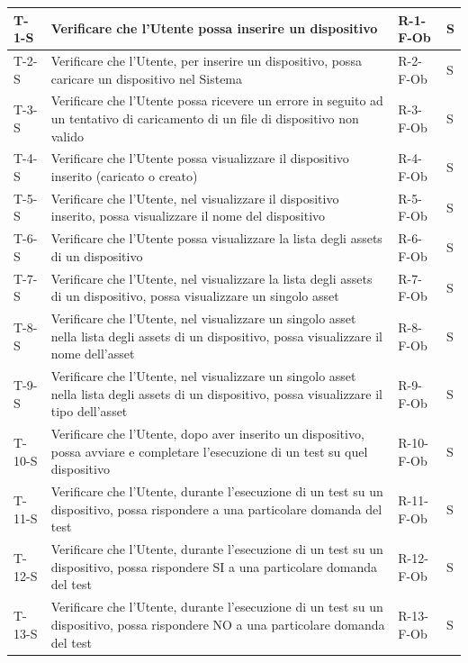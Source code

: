 \documentclass[a4paper,12pt]{article}
\begin{document}
{{\begin{longtable}{|p{}|p{}|p{}|p{}|}
                \hline
                \endlastfoot
                \hline
                T-1-S & Verificare che l'Utente possa inserire un dispositivo & R-1-F-Ob & S \\ \hline
                T-2-S & Verificare che l'Utente, per inserire un dispositivo, possa caricare un dispositivo nel Sistema & R-2-F-Ob & S \\ \hline
                T-3-S & Verificare che l'Utente possa ricevere un errore in seguito ad un tentativo di caricamento di un file di dispositivo non valido & R-3-F-Ob & S \\ \hline
                T-4-S & Verificare che l'Utente possa visualizzare il dispositivo inserito (caricato o creato) & R-4-F-Ob & S \\ \hline
                T-5-S & Verificare che l'Utente, nel visualizzare il dispositivo inserito, possa visualizzare il nome del dispositivo & R-5-F-Ob & S \\ \hline
                T-6-S & Verificare che l'Utente possa visualizzare la lista degli assets di un dispositivo & R-6-F-Ob & S \\ \hline
                T-7-S & Verificare che l'Utente, nel visualizzare la lista degli assets di un dispositivo, possa visualizzare un singolo asset & R-7-F-Ob & S \\ \hline
                T-8-S & Verificare che l'Utente, nel visualizzare un singolo asset nella lista degli assets di un dispositivo, possa visualizzare il nome dell'asset & R-8-F-Ob & S \\ \hline
                T-9-S & Verificare che l'Utente, nel visualizzare un singolo asset nella lista degli assets di un dispositivo, possa visualizzare il tipo dell'asset & R-9-F-Ob & S \\ \hline
                T-10-S & Verificare che l'Utente, dopo aver inserito un dispositivo, possa avviare e completare l'esecuzione di un test su quel dispositivo & R-10-F-Ob & S \\ \hline
                T-11-S & Verificare che l'Utente, durante l'esecuzione di un test su un dispositivo, possa rispondere a una particolare domanda del test & R-11-F-Ob & S \\ \hline
                T-12-S & Verificare che l'Utente, durante l'esecuzione di un test su un dispositivo, possa rispondere SI a una particolare domanda del test & R-12-F-Ob & S \\ \hline
                T-13-S & Verificare che l'Utente, durante l'esecuzione di un test su un dispositivo, possa rispondere NO a una particolare domanda del test & R-13-F-Ob & S \\ \hline

\end{longtable}}}
\end{document}

